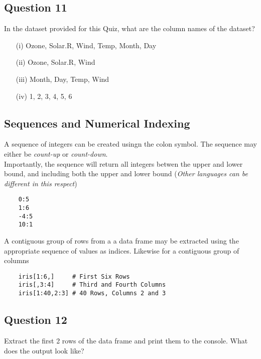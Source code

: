 \documentclass[12pt]{article}
\begin{document}
\newpage
\subsection*{Question 11}
\Large
In the dataset provided for this Quiz, what are the column names of the dataset?
\begin{itemize} 
\item[(i)] Ozone, Solar.R, Wind, Temp, Month, Day
\item[(ii)] Ozone, Solar.R, Wind
\item[(iii)] Month, Day, Temp, Wind
\item[(iv)] 1, 2, 3, 4, 5, 6
\end{itemize}

\newpage
\subsection*{Sequences and Numerical Indexing}
\Large

A sequence of integers can be created usingn the colon symbol. The sequence may either be \textit{count-up} or \textit{count-down}.
\\
Importantly, the sequence will return all integers betwen the upper and lower bound, and including both the upper and lower bound (\textit{Other languages can be different in this respect})
\begin{framed}
	\begin{verbatim}
	0:5
	1:6
	-4:5
	10:1
	\end{verbatim}
\end{framed}

\noindent A contiguous group of rows from a a data frame may be extracted using the appropriate sequence of values as indices. Likewise for a contiguous group of columns

\begin{framed}
	\begin{verbatim}
	iris[1:6,]     # First Six Rows
	iris[,3:4]     # Third and Fourth Columns
	iris[1:40,2:3] # 40 Rows, Columns 2 and 3
	\end{verbatim}
\end{framed}


\newpage
\subsection*{Question 12}
\Large
Extract the first 2 rows of the data frame and print them to the console. What does the output look like?
\end{document}
